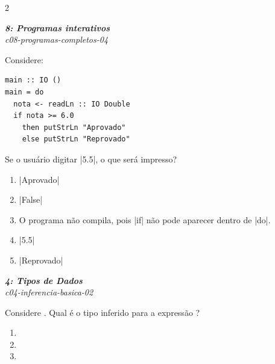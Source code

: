 \documentclass[a4paper,10pt,brazil]{article}
\begin{document}
\begin{multicols}{2}
\begin{enumerate}
\end{enumerate}

\begin{flushright}
  \footnotesize
  \textit{\textbf{8: Programas interativos}}\\
  \textit{c08-programas-completos-04}\\

\end{flushright}
Considere:

\begin{verbatim}
main :: IO ()
main = do
  nota <- readLn :: IO Double
  if nota >= 6.0
    then putStrLn "Aprovado"
    else putStrLn "Reprovado"
\end{verbatim}

Se o usuário digitar \haskellinline|5.5|, o que será impresso?

\begin{enumerate}
  \item \haskellinline|Aprovado|

  \item \haskellinline|False|

  \item O programa não compila, pois \haskellinline|if| não pode aparecer dentro de \haskellinline|do|.

  \item \haskellinline|5.5|

  \item \haskellinline|Reprovado|


\end{enumerate}

\begin{flushright}
  \footnotesize
  \textit{\textbf{4: Tipos de Dados}}\\
  \textit{c04-inferencia-basica-02}\\

\end{flushright}
Considere . Qual é o tipo inferido para a expressão ?

\begin{enumerate}
  \item {}

  \item {}

  \item {}


\end{enumerate}
\end{multicols}
\end{document}
